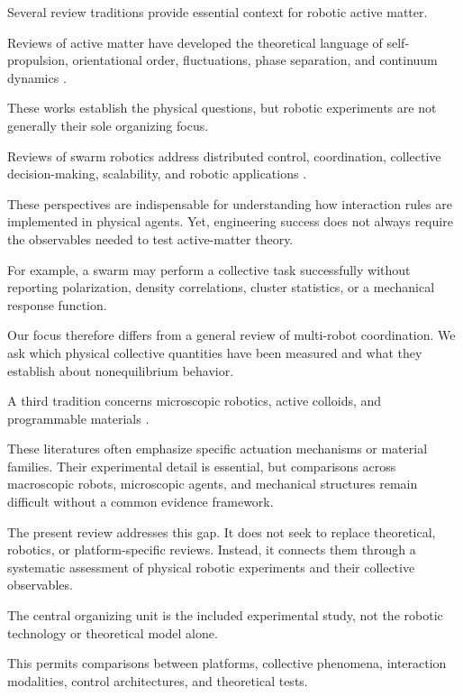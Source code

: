 Several review traditions provide essential context
for robotic active matter.

Reviews of active matter have developed
the theoretical language of
self-propulsion, orientational order,
fluctuations, phase separation,
and continuum dynamics
\cite{Ramaswamy2010mechanics}
\cite{Marchetti2013hydrodynamics}
\cite{Bechinger2016active}.

These works establish
the physical questions,
but robotic experiments
are not generally
their sole organizing
focus.

Reviews of swarm
robotics address
distributed control,
coordination,
collective decision-making,
scalability,
and robotic applications
\cite{Brambilla2013swarm}
\cite{Brambilla2013swarm}
\cite{Brambilla2013swarm}.

These perspectives
are indispensable
for understanding
how interaction
rules are implemented
in physical agents.
Yet, engineering
success does not
always require
the observables
needed to test
active-matter theory.

For example,
a swarm may
perform a
collective task
successfully without
reporting polarization,
density correlations,
cluster statistics,
or a mechanical
response function.

Our focus therefore
differs from a
general review
of multi-robot
coordination.
We ask which
physical collective
quantities have
been measured
and what they
establish about
nonequilibrium
behavior.

A third tradition
concerns microscopic
robotics, active
colloids, and
programmable materials
\cite{Wang2021trends}
\cite{Bechinger2016active}
\cite{Bertoldi2017flexible}.

These literatures
often emphasize
specific actuation
mechanisms or
material families.
Their experimental
detail is essential,
but comparisons
across macroscopic
robots, microscopic
agents, and
mechanical structures
remain difficult
without a common
evidence framework.

The present review
addresses this gap.
It does not seek
to replace
theoretical,
robotics,
or platform-specific
reviews.
Instead, it
connects them
through a
systematic assessment
of physical
robotic experiments
and their
collective observables.

The central organizing
unit is the
included experimental
study, not the
robotic technology
or theoretical
model alone.

This permits
comparisons between
platforms, collective
phenomena,
interaction modalities,
control architectures,
and theoretical
tests.

